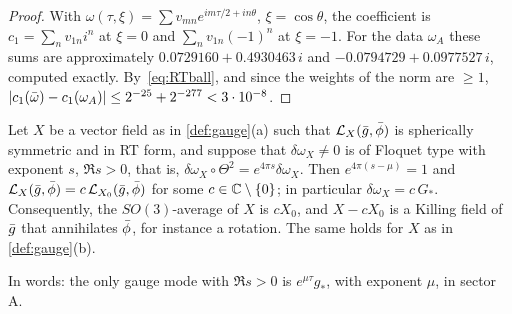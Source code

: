 \begin{proof}
With $\omega(\tau,\xi)=\sum v_{mn}e^{im\tau/2+in\theta}$, $\xi=\cos\theta$, the coefficient is
$c_1=\sum_nv_{1n}i^n$ at $\xi=0$ and $\sum_nv_{1n}(-1)^n$ at $\xi=-1$. For the data $\omega_A$ these sums are
approximately $0.0729160+0.4930463\,i$ and $-0.0794729+0.0977527\,i$, computed exactly. By~\eqref{eq:RTball},
and since the weights of the norm are $\ge1$, $|c_1(\bar\omega)-c_1(\omega_A)|\le2^{-25}+2^{-277}<3\cdot10^{-8}$.
\end{proof}

\begin{lemma}\label{lem:gauge}
Let $X$ be a vector field as in \cref{def:gauge}\textup{(a)} such that $\mathcal{L}_X(\bar g,\bar\phi)$ is spherically
symmetric and in RT form,
and suppose that $\delta\omega_X\neq0$ is of Floquet type with exponent $s$, $\Re s>0$, that is,
$\delta\omega_X\circ\Theta^2=e^{4\pi s}\delta\omega_X$. Then $e^{4\pi(s-\mu)}=1$ and
$\mathcal{L}_X(\bar g,\bar\phi)=c\,\mathcal{L}_{X_0}(\bar g,\bar\phi)$ for some $c\in\mathbb{C}\setminus\{0\}$; in particular
$\delta\omega_X=c\,G_*$. Consequently, the $SO(3)$-average of $X$ is $cX_0$, and $X-cX_0$ is a Killing field of $\bar g$ that
annihilates $\bar\phi$, for instance a rotation. The same holds for $X$ as in
\cref{def:gauge}\textup{(b)}.
\end{lemma}

In words: the only gauge mode with $\Re s>0$ is $e^{\mu\tau}g_*$, with exponent $\mu$, in sector A.

